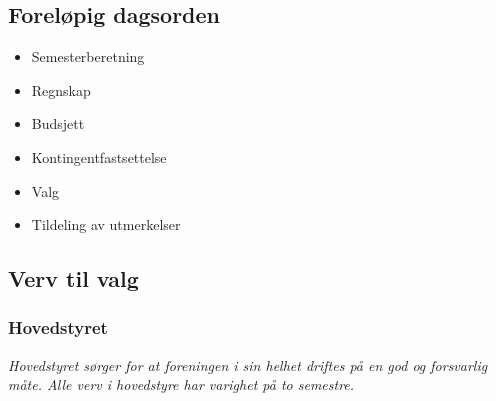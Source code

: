 \documentclass[12pt, norsk, a4paper]{proc}
\providecommand{\tightlist}{%
  \setlength{\itemsep}{0pt}\setlength{\parskip}{0pt}}
\begin{document}
\hypertarget{foreluxf8pig-dagsorden}{%
\subsection*{Foreløpig dagsorden}\label{foreluxf8pig-dagsorden}}

\begin{itemize}
    \tightlist
        \item
          Semesterberetning
        \item
          Regnskap
        \item
          Budsjett
        \item
          Kontingentfastsettelse
        \item
          Valg
        \item
          Tildeling av utmerkelser
\end{itemize}

\hypertarget{verv-til-valg}{%
\subsection*{Verv til valg}\label{verv-til-valg}}

\hypertarget{hovedstyret}{%
\subsubsection*{Hovedstyret}\label{hovedstyret}}

\emph{Hovedstyret sørger for at foreningen i sin helhet driftes på en
god og forsvarlig måte. Alle verv i hovedstyre har varighet på to
semestre.}
\end{document}
